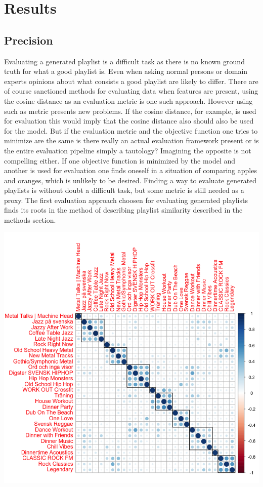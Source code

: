 \documentclass[a4paper,11pt]{kth-mag}
\begin{document}
\chapter{Results}
\section{Precision}
Evaluating a generated playlist is a difficult task as there is no known ground truth for what a good playlist is. Even when asking normal persons or domain experts opinions about what consists a good playlist are likely to differ. There are of course sanctioned methods for evaluating data when features are present, using the cosine distance as an evaluation metric is one such approach. However using such as metric presents new problems. If the cosine distance, for example, is used for evaluation this would imply that the cosine distance also should also be used for the model. But if the evaluation metric and the objective function one tries to minimize are the same is there really an actual evaluation framework present or is the entire evaluation pipeline simply a tautology? Imagining the opposite is not compelling either. If one objective function is minimized by the model and another is used for evaluation one finds oneself in a situation of comparing apples and oranges, which is unlikely to be desired. Finding a way to evaluate generated playlists is without doubt a difficult task, but some metric is still needed as a proxy.
The first evaluation approach choosen for evaluating generated playlists finds its roots in the method of describing playlist similarity described in the methods section. 

\includegraphics[scale=0.6]{images/sumAbsAgglHierClust-better.png}
\end{document}
